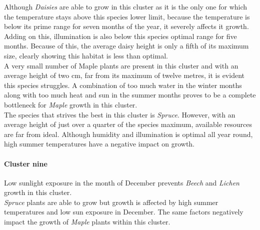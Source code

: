 Although \textit{Daisies} are able to grow in this cluster as it is the only one for which the temperature stays above this species lower limit, because the temperature is below its prime range for seven months of the year, it severely affects it growth. Adding on this, illumination is also below this species optimal range for five months. Because of this, the average daisy height is only a fifth of its maximum size, clearly showing this habitat is less than optimal.\\
A very small number of Maple plants are present in this cluster and with an average height of two cm, far from its maximum of twelve metres, it is evident this species struggles. A combination of too much water in the winter months along with too much heat and sun in the summer months proves to be a complete bottleneck for \textit{Maple} growth in this cluster.\\
The species that strives the best in this cluster is \textit{Spruce}. However, with an average height of just over a quarter of the species maximum, available resources are far from ideal. Although humidity and illumination is optimal all year round, high summer temperatures have a negative impact on growth.\\

\paragraph{Cluster nine}

Low sunlight exposure in the month of December prevents \textit{Beech} and \textit{Lichen} growth in this cluster.\\
\textit{Spruce} plants are able to grow but growth is affected by high summer temperatures and low sun exposure in December. The same factors negatively impact the growth of \textit{Maple} plants within this cluster.\\